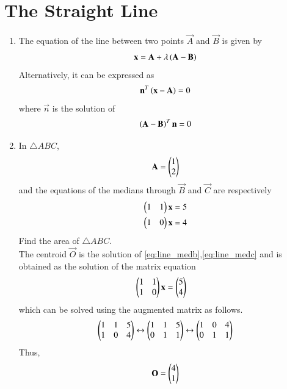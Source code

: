 \documentclass[journal,12pt,twocolumn]{IEEEtran}
\renewcommand\thesection{\arabic{section}}
\begin{document}
\section{The Straight Line}
\begin{enumerate}[label=\thesection.\arabic*
,ref=\thesection.\theenumi]
\item The equation of the line between two points $\vec{A}$ and $\vec{B}$ is given by
\begin{equation}
\mathbf{x} = \mathbf{A} + \lambda \left(\mathbf{A}-\mathbf{B}\right)
\end{equation}
%
Alternatively, it can be expressed as
\begin{equation}
\label{eq:line_normal}
\mathbf{n}^T\left(\mathbf{x}-\mathbf{A}\right) = 0
\end{equation}
%
where $\vec{n}$ is the solution of
\begin{equation}
\label{eq:normal_slope}
\left(\mathbf{A}-\mathbf{B}\right)^T\mathbf{n} = 0
\end{equation}
\item In $\triangle ABC$,
\begin{equation}
\label{eq:linea}
\mathbf{A}=\begin{pmatrix}1\\2\end{pmatrix}
\end{equation}
%
and the equations of the medians through $\vec{B}$ and $\vec{C}$
are respectively
\begin{align}
\label{eq:line_medb}
\begin{pmatrix}1 & 1\end{pmatrix}\mathbf{x}&=5
\\
\begin{pmatrix}1 & 0\end{pmatrix}\mathbf{x}&=4
\label{eq:line_medc}
\end{align}
%
Find the area of $\triangle ABC$.
\\
\solution The centroid $\vec{O}$ is the solution of \eqref{eq:line_medb},\eqref{eq:line_medc} and is obtained 
as the solution
of the matrix equation
\begin{align}
\begin{pmatrix}1 & 1 \\1 & 0\end{pmatrix}\mathbf{x}&=\begin{pmatrix}5 \\ 4\end{pmatrix}
\label{eq:line_matrix}
\end{align}
%
which can be solved using the augmented matrix as follows.
\begin{align}
\begin{pmatrix}1 & 1 & 5\\1 & 0 & 4\end{pmatrix} \leftrightarrow \begin{pmatrix}1 & 1 & 5\\0 & 1 & 1\end{pmatrix}\leftrightarrow  \begin{pmatrix}1 & 0 & 4\\0 & 
1 & 1\end{pmatrix}
\end{align}
Thus,
\begin{equation}
\label{eq:lineo}
\vec{O}=\myvec{4\\1}

\end{equation}
\end{enumerate}
\end{document}
